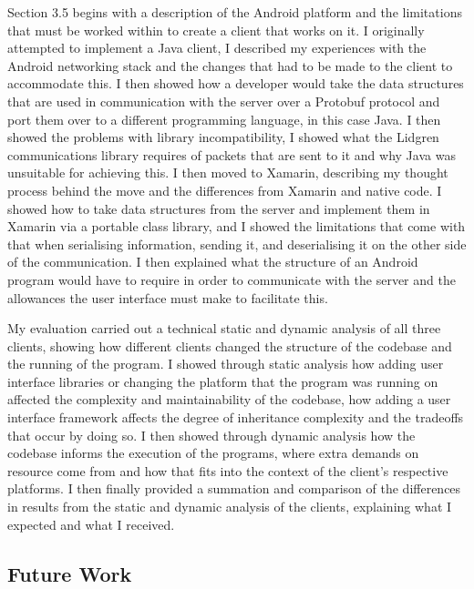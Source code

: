 \documentclass{article}
\begin{document}
Section 3.5 begins with a description of the Android platform and the limitations that must be worked within to create a client that works on it. I originally attempted to implement a Java client, I described my experiences with the Android networking stack and the changes that had to be made to the client to accommodate this. I then showed how a developer would take the data structures that are used in communication with the server over a Protobuf protocol and port them over to a different programming language, in this case Java. I then showed the problems with library incompatibility, I showed what the Lidgren communications library requires of packets that are sent to it and why Java was unsuitable for achieving this. I then moved to Xamarin, describing my thought process behind the move and the differences from Xamarin and native code. I showed how to take data structures from the server and implement them in Xamarin via a portable class library, and I showed the limitations that come with that when serialising information, sending it, and deserialising it on the other side of the communication. I then explained what the structure of an Android program would have to require in order to communicate with the server and the allowances the user interface must make to facilitate this.

My evaluation carried out a technical static and dynamic analysis of all three clients, showing how different clients changed the structure of the codebase and the running of the program. I showed through static analysis how adding user interface libraries or changing the platform that the program was running on affected the complexity and maintainability of the codebase, how adding a user interface framework affects the degree of inheritance complexity and the tradeoffs that occur by doing so. I then showed through dynamic analysis how the codebase informs the execution of the programs, where extra demands on resource come from and how that fits into the context of the client’s respective platforms. I then finally provided a summation and comparison of the differences in results from the static and dynamic analysis of the clients, explaining what I expected and what I received.
\subsection{Future Work}
\end{document}
